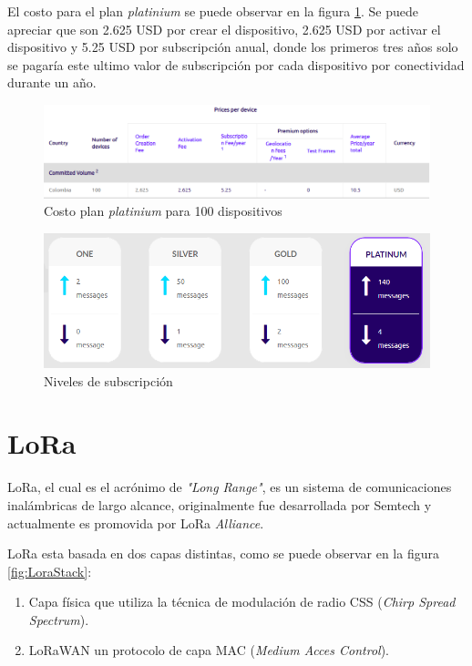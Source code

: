 El costo para el plan \textit{platinium} se puede observar en la figura \ref{fig:CostoSigfox}. Se puede apreciar que son 2.625 USD por crear el dispositivo, 2.625 USD por activar el dispositivo y 5.25 USD por subscripción anual, donde los primeros tres años solo se pagaría este ultimo valor de subscripción por cada dispositivo por conectividad durante un año.

\begin{figure}[h]
	\centering
	\includegraphics[scale=.5]{./Figures/CostoSigfox.PNG}
	\caption{Costo plan \textit{platinium} para 100 dispositivos\protect\footnotemark}
	\label{fig:CostoSigfox}
\end{figure}
\begin{figure}[h]
	\centering
	\includegraphics[scale=.6]{./Figures/PlanesSigfox.PNG}
	\caption{Niveles de subscripción\protect\footnotemark}
	\label{fig:PlanesSigfox}
\end{figure}

\section{LoRa}
LoRa, el cual es el acrónimo de \textit{"Long Range"}, es un sistema de comunicaciones inalámbricas de largo alcance, originalmente fue desarrollada por Semtech y actualmente es promovida por LoRa \textit{Alliance}.

LoRa esta basada en dos capas distintas, como se puede observar en la figura \ref{fig:LoraStack}: 
\begin{enumerate}
    \item Capa física que utiliza la técnica de modulación  de radio CSS (\textit{Chirp Spread Spectrum})\citep{CSS}.
    \item LoRaWAN un protocolo de capa MAC (\textit{Medium Acces Control})\cite{LoRaAlliance2015}.
\end{enumerate}

